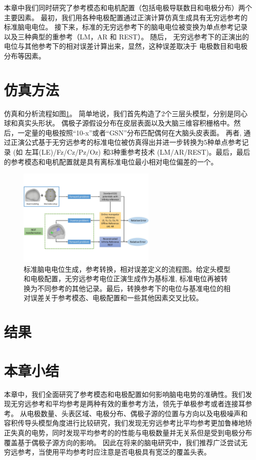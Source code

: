 本章中我们同时研究了参考模态和电机配置（包括电极导联数目和电极分布）两个主要因素。 最初，我们用各种电极配置通过正演计算仿真生成具有无穷远参考的标准脑电电位。 接下来，标准的无穷远参考下的脑电电位被变换为单点参考记录以及三种典型的重参考（LM，AR 和 REST）。 随后， 无穷远参考下的正演出的电位与其他参考下的相对误差计算出来，显然，这种误差取决于 电极数目和电极分布等因素。

\section{仿真方法}
仿真和分析流程如图\ref{2.1}。 简单地说，我们首先构造了2个三层头模型，分别是同心球和真实头形状。 偶极子源假设分布在皮层表面以及大脑三维容积栅格中。然后，一定量的电极按照“10-x”或者“GSN”分布匹配偶何在大脑头皮表面。 再者, 通过正演公式基于无穷远参考的标准电位被仿真得出并进一步转换为5种单点参考记录 (如 左耳(LE)/Fz/Cz/Pz/Oz) 和3种重参考技术 (LM/AR/REST)。最后，最后的参考模态和电机配置就是具有离标准电位最小相对电位偏差的一个。
\begin{figure}[ht]
	\centering
	\includegraphics[width=0.6\textwidth,natwidth=610,natheight=642]{pic/2.1.pdf}
	\caption{标准脑电电位生成，参考转换，相对误差定义的流程图。给定头模型和电极配置，无穷远参考电位正演生成作为基标准, 标准电位再被转换为不同参考的其他记录。最后，转换参考下的电位与基准电位的相对误差关于参考模态、电极配置和一些其他因素交叉比较。}
	\label{2.1}
\end{figure}

\section{结果}

\section{本章小结}
本章中，我们全面研究了参考模态和电极配置如何影响脑电电势的准确性。我们发现无穷远参考和平均参考是两种有效的重参考方法，领先于单极参考或者连接耳参考。 从电极数量、头表区域、电极分布、偶极子源的位置与方向以及电极噪声和容积传导头模型角度进行比较研究，我们发现无穷远参考比平均参考更加鲁棒地矫正失真的电势，同时发现平均参考的的性能与电极数量并无关系但是受到电极分布覆盖基于偶极子源方向的影响。 因此在将来的脑电研究中，我们推荐广泛尝试无穷远参考，当使用平均参考时应注意是否电极具有宽泛的覆盖头表。